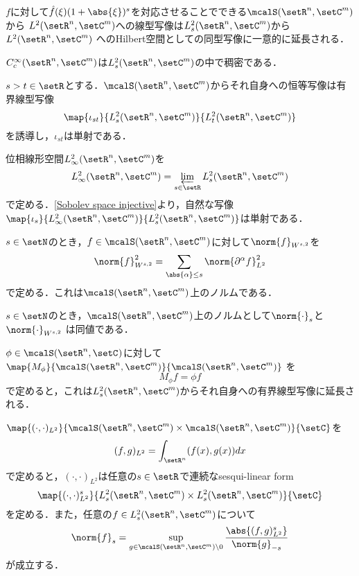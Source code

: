 \documentclass[uplatex,dvipdfmx]{jsarticle}
\newcommand{\sobolev}[1]{L^{2}_{#1}}
\newcommand{\sobolevlocal}[3]{\sobolev{#1}(\setR^{#2},\setC^{#3})}
\newcommand{\cptsmoothfct}[2]{C^{\infty}_{c}(\setR^{#1},\setC^{#2})}
\newcommand{\schwartz}[2]{\mcalS(\setR^{#1},\setC^{#2})}
\newcommand{\dd}{d} %
\begin{document}
\begin{lemma}
  $f$に対して$\hat{f}(\xi)(1+\abs{\xi})^s$を対応させることでできる$\schwartz{n}{m}$から
  $L^2(\setR^n,\setC^m)$への線型写像は$\sobolevlocal{s}{n}{m}$から$L^2(\setR^n,\setC^m)$
  へのHilbert空間としての同型写像に一意的に延長される．
\end{lemma}

\begin{proposition}
  $\cptsmoothfct{n}{m}$は$\sobolevlocal{s}{n}{m}$の中で稠密である．
\end{proposition}

\begin{proposition}\label{Sobolev space injective}
  $s>t\in \setR$とする．$\schwartz{n}{m}$からそれ自身への恒等写像は有界線型写像
  \[ \map{\iota_{st}}{\sobolevlocal{s}{n}{m}}{\sobolevlocal{t}{n}{m}} \]
  を誘導し，$\iota_{st}$は単射である．
\end{proposition}

\begin{definition}
  位相線形空間$\sobolevlocal{\infty}{n}{m}$を
  \[ \sobolevlocal{\infty}{n}{m} = \varprojlim_{s\in\setR} \sobolevlocal{s}{n}{m} \]
  で定める．\cref{Sobolev space injective}より，自然な写像
  $\map{\iota_{s}}{\sobolevlocal{\infty}{n}{m}}{\sobolevlocal{s}{n}{m}}$は単射である．
\end{definition}

\begin{definition}
  $s\in \setN$のとき，$f\in\schwartz{n}{m}$に対して$\norm{f}_{W^{s,2}}$を
  \[ \norm{f}^2_{W^{s,2}} = \sum_{\abs{\alpha}\leq s} \norm{\partial^\alpha f}_{L^2}^2 \]
  で定める．これは$\schwartz{n}{m}$上のノルムである．
\end{definition}

\begin{proposition}
  $s\in \setN$のとき，$\schwartz{n}{m}$上のノルムとして$\norm{\cdot}_s$と$\norm{\cdot}_{W^{s,2}}$
  は同値である．
\end{proposition}

\begin{proposition}
  $\phi\in \schwartz{n}{}$に対して$\map{M_\phi}{\schwartz{n}{m}}{\schwartz{n}{m}}$
  を
  \[ M_\phi f = \phi f \]
  で定めると，これは$\sobolevlocal{s}{n}{m}$からそれ自身への有界線型写像に延長される．
\end{proposition}

\begin{proposition}
  $\map{(\cdot,\cdot)_{L^2}}{\schwartz{n}{m}\times\schwartz{n}{m}}{\setC}$を
  \[(f,g)_{L^2} = \int_{\setR^n} (f(x),g(x)) \dd x \]
  で定めると，$(\cdot,\cdot)_{L^2}$は任意の$s\in \setR$で連続なsesqui-linear form
  \[ \map{(\cdot,\cdot)^s_{L^2}}{\sobolevlocal{s}{n}{m}\times\sobolevlocal{s}{n}{m}}{\setC} \]
  を定める．また，任意の$f\in \sobolevlocal{s}{n}{m}$について
  \[ \norm{f}_s = \sup_{g\in \schwartz{n}{m}\setminus 0} \frac{\abs{(f,g)_{L^2}^s}}{\norm{g}_{-s}} \]
  が成立する．
\end{proposition}
\end{document}
